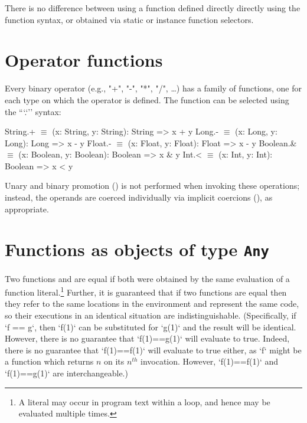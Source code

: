 There is no difference between using a function defined directly 
directly using the function syntax, or obtained via static or
instance function selectors.


\section{Operator functions}
\label{OperatorFunction}
Every binary operator (e.g.,
\xcd"+",
\xcd"-",
\xcd"*",
\xcd"/",
\dots) has a family of functions, one for
each type on which the operator is defined. The function can be
selected using the ``\xcd`.`'' syntax:


\begin{xtenmath}
String.+    $\equiv$ (x: String, y: String): String => x + y
Long.-      $\equiv$ (x: Long, y: Long): Long => x - y
Float.-     $\equiv$ (x: Float, y: Float): Float => x - y
Boolean.&   $\equiv$ (x: Boolean, y: Boolean): Boolean => x & y
Int.<       $\equiv$ (x: Int, y: Int): Boolean => x < y
\end{xtenmath}

\begin{xten}
\end{xten}
%


Unary and binary promotion () is not performed
when invoking these
operations; instead, the operands are coerced individually via implicit
coercions (), as appropriate.


\section{Functions as objects of type {\tt Any}}
\label{FunctionAnyMethods}

\label{FunctionEquality}
  Two functions  and
 are equal if both were obtained by the same evaluation of a function
literal.\footnote{A literal may occur in program text within a loop, and hence
  may be evaluated multiple times.} Further, it is guaranteed that if two
functions are equal then they refer to the same locations in the environment
and represent the same code, so their executions in an identical situation are
indistinguishable. (Specifically, if \xcd`f == g`, then \xcd`f(1)` can be
substituted for \xcd`g(1)` and the result will be identical. However, there is
no guarantee that \xcd`f(1)==g(1)` will evaluate to true. Indeed, there is no
guarantee that \xcd`f(1)==f(1)` will evaluate to true either, as \xcd`f` might
be a function which returns {$n$} on its {$n^{th}$} invocation. However,
\xcd`f(1)==f(1)` and \xcd`f(1)==g(1)` are interchangeable.)


